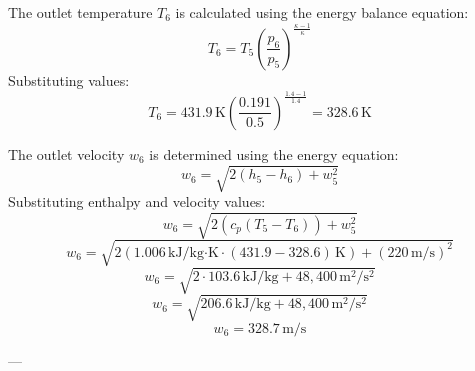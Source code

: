 The outlet temperature \( T_6 \) is calculated using the energy balance equation:  
\[
T_6 = T_5 \left( \frac{p_6}{p_5} \right)^{\frac{\kappa - 1}{\kappa}}
\]  
Substituting values:  
\[
T_6 = 431.9 \, \text{K} \left( \frac{0.191}{0.5} \right)^{\frac{1.4 - 1}{1.4}} = 328.6 \, \text{K}
\]  

The outlet velocity \( w_6 \) is determined using the energy equation:  
\[
w_6 = \sqrt{2 \left( h_5 - h_6 \right) + w_5^2}
\]  
Substituting enthalpy and velocity values:  
\[
w_6 = \sqrt{2 \left( c_p \left( T_5 - T_6 \right) \right) + w_5^2}
\]  
\[
w_6 = \sqrt{2 \left( 1.006 \, \text{kJ/kg·K} \cdot (431.9 - 328.6) \, \text{K} \right) + (220 \, \text{m/s})^2}
\]  
\[
w_6 = \sqrt{2 \cdot 103.6 \, \text{kJ/kg} + 48,400 \, \text{m}^2/\text{s}^2}
\]  
\[
w_6 = \sqrt{206.6 \, \text{kJ/kg} + 48,400 \, \text{m}^2/\text{s}^2}
\]  
\[
w_6 = 328.7 \, \text{m/s}
\]  

---